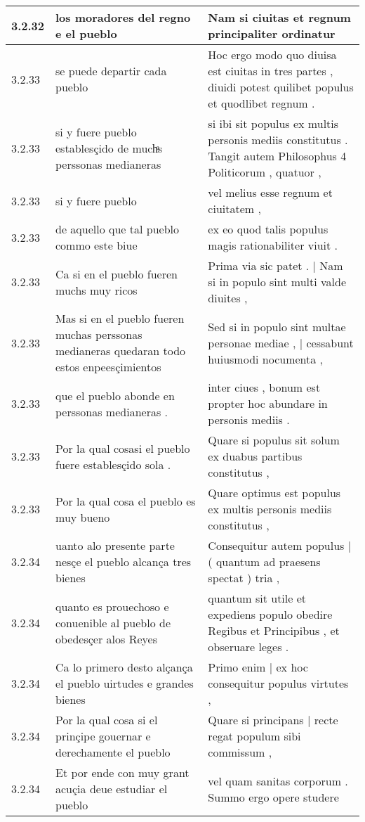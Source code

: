 \begin{tabular}{|p{1cm}|p{6.5cm}|p{6.5cm}|}
3.2.32 & los moradores del regno e el pueblo & Nam si ciuitas et regnum principaliter ordinatur \\\hline
3.2.33 & se puede departir cada pueblo & Hoc ergo modo quo diuisa est ciuitas in tres partes , diuidi potest quilibet populus et quodlibet regnum . \\\hline
3.2.33 & si y fuere pueblo establesçido de muchͣs perssonas medianeras & si ibi sit populus ex multis personis mediis constitutus . Tangit autem Philosophus 4 Politicorum , quatuor , \\\hline
3.2.33 & si y fuere pueblo & vel melius esse regnum et ciuitatem , \\\hline
3.2.33 & de aquello que tal pueblo commo este biue & ex eo quod talis populus magis rationabiliter viuit . \\\hline
3.2.33 & Ca si en el pueblo fueren muchs muy ricos & Prima via sic patet . | Nam si in populo sint multi valde diuites , \\\hline
3.2.33 & Mas si en el pueblo fueren muchas perssonas medianeras quedaran todo estos enpeesçimientos & Sed si in populo sint multae personae mediae , | cessabunt huiusmodi nocumenta , \\\hline
3.2.33 & que el pueblo abonde en perssonas medianeras . & inter ciues , bonum est propter hoc abundare in personis mediis . \\\hline
3.2.33 & Por la qual cosasi el pueblo fuere establesçido sola . & Quare si populus sit solum ex duabus partibus constitutus , \\\hline
3.2.33 & Por la qual cosa el pueblo es muy bueno & Quare optimus est populus ex multis personis mediis constitutus , \\\hline
3.2.34 & uanto alo presente parte nesçe el pueblo alcança tres bienes & Consequitur autem populus | ( quantum ad praesens spectat ) tria , \\\hline
3.2.34 & quanto es prouechoso e conuenible al pueblo de obedesçer alos Reyes & quantum sit utile et expediens populo obedire Regibus et Principibus , et obseruare leges . \\\hline
3.2.34 & Ca lo primero desto alçança el pueblo uirtudes e grandes bienes & Primo enim | ex hoc consequitur populus virtutes , \\\hline
3.2.34 & Por la qual cosa si el prinçipe gouernar e derechamente el pueblo & Quare si principans | recte regat populum sibi commissum , \\\hline
3.2.34 & Et por ende con muy grant acuçia deue estudiar el pueblo & vel quam sanitas corporum . Summo ergo opere studere \\\hline

\end{tabular}
